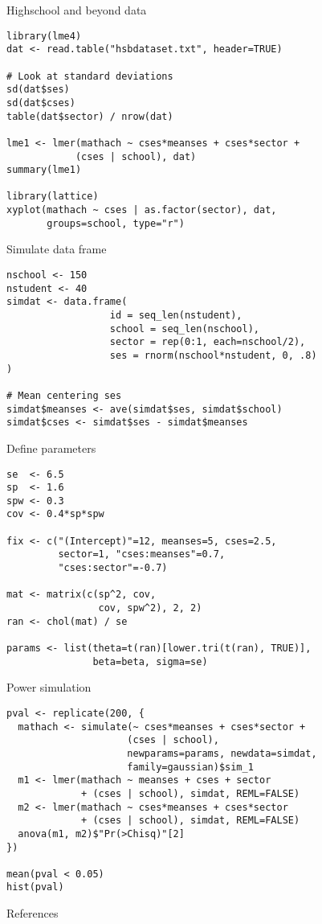 \documentclass{beamer}
\begin{document}
{

\begin{frame}[fragile]{Highschool and beyond data}
  \begin{lstlisting}
library(lme4)
dat <- read.table("hsbdataset.txt", header=TRUE)

# Look at standard deviations
sd(dat$ses)
sd(dat$cses)
table(dat$sector) / nrow(dat)

lme1 <- lmer(mathach ~ cses*meanses + cses*sector + 
            (cses | school), dat)
summary(lme1)

library(lattice)
xyplot(mathach ~ cses | as.factor(sector), dat, 
       groups=school, type="r")
  \end{lstlisting}
\end{frame}


\begin{frame}[fragile]{Simulate data frame}
  \begin{lstlisting}
nschool <- 150
nstudent <- 40
simdat <- data.frame( 
                  id = seq_len(nstudent),
                  school = seq_len(nschool),
                  sector = rep(0:1, each=nschool/2),
                  ses = rnorm(nschool*nstudent, 0, .8)
)

# Mean centering ses
simdat$meanses <- ave(simdat$ses, simdat$school)
simdat$cses <- simdat$ses - simdat$meanses
  \end{lstlisting}
\end{frame}

\begin{frame}[fragile]{Define parameters}
  \begin{lstlisting}
se  <- 6.5
sp  <- 1.6
spw <- 0.3
cov <- 0.4*sp*spw

fix <- c("(Intercept)"=12, meanses=5, cses=2.5, 
         sector=1, "cses:meanses"=0.7, 
         "cses:sector"=-0.7)

mat <- matrix(c(sp^2, cov,
                cov, spw^2), 2, 2)
ran <- chol(mat) / se

params <- list(theta=t(ran)[lower.tri(t(ran), TRUE)],
               beta=beta, sigma=se)
  \end{lstlisting}
\end{frame}


\begin{frame}[fragile]{Power simulation}
  \begin{lstlisting}
pval <- replicate(200, {
  mathach <- simulate(~ cses*meanses + cses*sector + 
                     (cses | school),
                     newparams=params, newdata=simdat,
                     family=gaussian)$sim_1
  m1 <- lmer(mathach ~ meanses + cses + sector
             + (cses | school), simdat, REML=FALSE)
  m2 <- lmer(mathach ~ cses*meanses + cses*sector
             + (cses | school), simdat, REML=FALSE)
  anova(m1, m2)$"Pr(>Chisq)"[2]
})

mean(pval < 0.05)
hist(pval)
  \end{lstlisting}
\end{frame}

}

\appendix
\begin{frame}{References}
\renewcommand{\bibfont}{\footnotesize}


\vfill
\end{frame}
\end{document}
